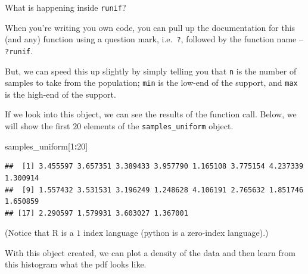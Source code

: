 \documentclass[
]{book}
\newenvironment{Shaded}{\begin{snugshade}}{\end{snugshade}}
\newcommand{\DecValTok}[1]{\textcolor[rgb]{0.00,0.00,0.81}{#1}}
\newcommand{\NormalTok}[1]{#1}
\newcommand{\SpecialCharTok}[1]{\textcolor[rgb]{0.81,0.36,0.00}{\textbf{#1}}}
\theoremstyle{definition}
\theoremstyle{definition}
\theoremstyle{definition}
\theoremstyle{definition}
\theoremstyle{remark}
\begin{document}
What is happening inside \texttt{runif}?

When you're writing you own code, you can pull up the documentation for this (and any) function using a question mark, i.e.~\texttt{?}, followed by the function name -- \texttt{?runif}.

But, we can speed this up slightly by simply telling you that \texttt{n} is the number of samples to take from the population; \texttt{min} is the low-end of the support, and \texttt{max} is the high-end of the support.

If we look into this object, we can see the results of the function call. Below, we will show the first \(20\) elements of the \texttt{samples\_uniform} object.

\begin{Shaded}
\begin{Highlighting}[]
\NormalTok{samples\_uniform[}\DecValTok{1}\SpecialCharTok{:}\DecValTok{20}\NormalTok{]}
\end{Highlighting}
\end{Shaded}

\begin{verbatim}
##  [1] 3.455597 3.657351 3.389433 3.957790 1.165108 3.775154 4.237339 1.300914
##  [9] 1.557432 3.531531 3.196249 1.248628 4.106191 2.765632 1.851746 1.650859
## [17] 2.290597 1.579931 3.603027 1.367001
\end{verbatim}

(Notice that R is a \(1\) index language (python is a zero-index language).)

With this object created, we can plot a density of the data and then learn from this histogram what the pdf looks like.
\end{document}
